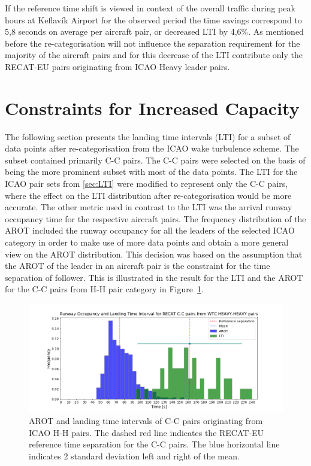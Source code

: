 If the reference time shift is viewed in context of the overall traffic during peak hours at Keflavík Airport for the observed period the time savings correspond to 5,8 seconds on average per aircraft pair, or decreased LTI by 4,6\%. As mentioned before the re-categorisation will not influence the separation requirement for the majority of the aircraft pairs and for this decrease of the LTI contribute only the RECAT-EU pairs originating from ICAO Heavy leader pairs.




\section{Constraints for Increased Capacity}%

The following section presents the landing time intervals (LTI) for a subset of data points after re-categorisation from the ICAO wake turbulence scheme. The subset contained primarily C-C pairs. The C-C pairs were selected on the basis of being the more prominent subset with most of the data points. The LTI for the ICAO pair sets from \ref{sec:LTI} were modified to represent only the C-C pairs, where the effect on the LTI distribution after re-categorisation would be more accurate. The other metric used in contrast to the LTI was the arrival runway occupancy time for the respective aircraft pairs. The frequency distribution of the AROT included the runway occupancy for all the leaders of the selected ICAO category in order to make use of more data points and obtain a more general view on the AROT distribution. This decision was based on the assumption that the AROT of the leader in an aircraft pair is the constraint for the time separation of follower. This is illustrated in the result for the LTI and the AROT for the C-C pairs from H-H pair category in Figure~\ref{fig:CC_from_HH_pairs_time_sep}. 

\begin{figure}[h]
    \centering
    \includegraphics[width=1\textwidth]{graphics/fig_CC_from_HH_pairs_time_sep.png}
    \caption[AROT and LTI of C-C pairs originating from ICAO H-H pairs]{AROT and landing time intervals of C-C pairs originating from ICAO H-H pairs. The dashed red line indicates the RECAT-EU reference time separation for the C-C pairs. The blue horizontal line indicates 2 standard deviation left and right of the mean.}
    \label{fig:CC_from_HH_pairs_time_sep}
\end{figure}

